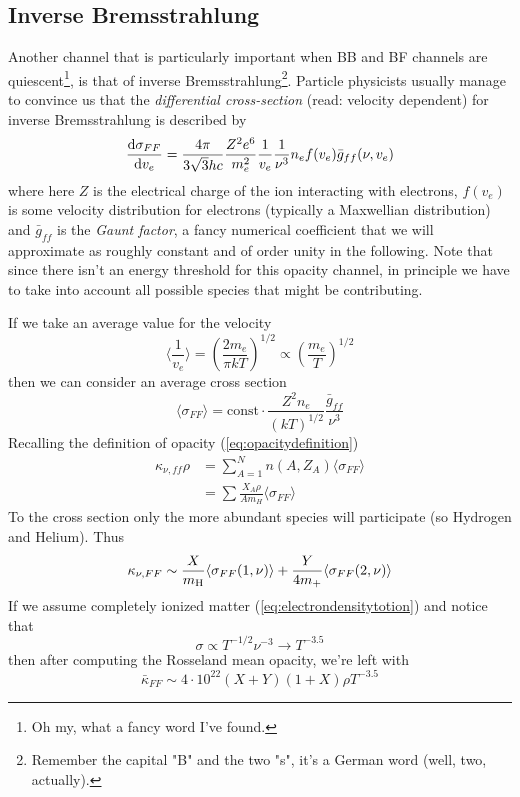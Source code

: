 \subsection{Inverse Bremsstrahlung}

Another channel that is particularly important when BB and BF channels are quiescent\footnote{Oh my, what a fancy word I've found.}, is that of inverse Bremsstrahlung\footnote{Remember the capital "B" and the two "s", it's a German word (well, two, actually).}. Particle physicists usually manage to convince us that the \emph{differential cross-section} (read: velocity dependent) for inverse Bremsstrahlung is described by
\begin{equation}
	\frac{\text{d}\sigma_{FF}}{\text{d}v_{e}} = \frac{4\pi}{3\sqrt{3}hc}\frac{Z^{2}e^{6}}{m_{e}^{2}}\frac{1}{v_{e}}\frac{1}{\nu^{3}}n_{e}f(v_{e})\bar{g}_{ff}(\nu, v_{e})
	\label{eq:diFFerentialcrosssection}
\end{equation}
where here $Z$ is the electrical charge of the ion interacting with electrons, $f(v_{e})$ is some velocity distribution for electrons (typically a Maxwellian distribution) and $\bar{g}_{ff}$ is the \emph{Gaunt factor}, a fancy numerical coefficient that we will approximate as roughly constant and of order unity in the following. Note that since there isn't an energy threshold for this opacity channel, in principle we have to take into account all possible species that might be contributing.
\par If we take an average value for the velocity
\begin{equation*}
	\langle \frac{1}{v_{e}} \rangle = \left(\frac{2m_{e}}{\pi k T}\right)^{1/2}\propto \left(\frac{m_{e}}{T}\right)^{1/2}
\end{equation*}
then we can consider an average cross section 
\begin{equation*}
	\langle \sigma_{FF} \rangle = \text{const}\cdot \frac{Z^{2}n_{e}}{(kT)^{1/2}}\frac{\bar{g}_{ff}}{\nu^{3}}
\end{equation*}
Recalling the definition of opacity (\ref{eq:opacitydefinition})
\begin{align*}
	\kappa_{\nu, ff}\rho &= \sum_{A=1}^{N}n(A,Z_{A})\langle \sigma_{FF} \rangle \\
	&=\sum \frac{X_{A}\rho}{Am_{H}}\langle \sigma_{FF} \rangle
\end{align*}
To the cross section only the more abundant species will participate (so Hydrogen and Helium). Thus
\begin{equation*}
	\kappa_{\nu,FF} \sim \frac{X}{m_{\text{H}}}\langle \sigma_{FF}(1,\nu) \rangle +\frac{Y}{4m_{\text+}}\langle \sigma_{FF}(2,\nu) \rangle
\end{equation*}
If we assume completely ionized matter (\ref{eq:electrondensitytotion}) and notice that $$\sigma \propto T^{-1/2}\nu^{-3}\to T^{-3.5}$$ then after computing the Rosseland mean opacity, we're left with 
\begin{equation}
	\bar{\kappa}_{FF} \sim 4\cdot 10^{22}(X+Y)(1+X)\rho T^{-3.5}
	\label{eq:inversebremsstrahlungopacity}
\end{equation}

